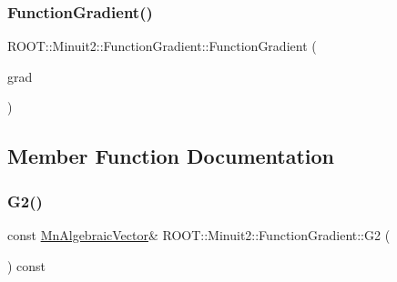 \subsubsection{\texorpdfstring{FunctionGradient()}{FunctionGradient()}\hspace{0.1cm}{\footnotesize\ttfamily [8/8]}}
{\footnotesize\ttfamily R\+O\+O\+T\+::\+Minuit2\+::\+Function\+Gradient\+::\+Function\+Gradient (\begin{DoxyParamCaption}\item[{const \mbox{\hyperlink{classROOT_1_1Minuit2_1_1FunctionGradient}{Function\+Gradient}} \&}]{grad }\end{DoxyParamCaption})\hspace{0.3cm}{\ttfamily [inline]}}



\subsection{Member Function Documentation}
\mbox{\label{classROOT_1_1Minuit2_1_1FunctionGradient_a6f99988a7fd1a61ed96c6709f02b6041}} 
\subsubsection{\texorpdfstring{G2()}{G2()}\hspace{0.1cm}{\footnotesize\ttfamily [1/2]}}
{\footnotesize\ttfamily const \mbox{\hyperlink{namespaceROOT_1_1Minuit2_a62ed97730a1ca8d3fbaec64a19aa11c9}{Mn\+Algebraic\+Vector}}\& R\+O\+O\+T\+::\+Minuit2\+::\+Function\+Gradient\+::\+G2 (\begin{DoxyParamCaption}{ }\end{DoxyParamCaption}) const\hspace{0.3cm}{\ttfamily [inline]}}

